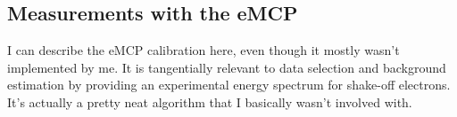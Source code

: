 \subsection{Measurements with the eMCP}
	I can describe the eMCP calibration here, even though it mostly wasn't implemented by me.  It is tangentially relevant to data selection and background estimation by providing an experimental energy spectrum for shake-off electrons.  It's actually a pretty neat algorithm that I basically wasn't involved with.





